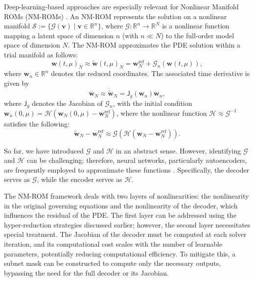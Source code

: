 \documentclass[11pt]{article}
\renewcommand{\vec}[1]{\mathbf{#1}}
\newcommand{\mat}[1]{\mathsf{#1}}
\begin{document}
            Deep-learning-based approaches are especially relevant for Nonlinear Manifold ROMs (NM-ROMs) \cite{kim2022fast,jain2017quadratic}.
            An NM-ROM represents the solution on a nonlinear manifold $\mathcal{S} := \{\mathscr{G} (\vec{v}) \mid \vec{v} \in \mathbb{R}^{n}\}$, where $\mathscr{G} : \mathbb{R}^{n} \rightarrow \mathbb{R}^{N}$ is a nonlinear function mapping a latent space of dimension $n$ (with $n \ll N$) to the full-order model space of dimension $N$.
            The NM-ROM approximates the PDE solution within a trial manifold as follows:
            \begin{equation}
                \vec{w}(t,\mu)_N \approx \widetilde{\vec{w}}(t,\mu)_N = \vec{w}^{\text{ref}}_N + \mathscr{G}_n(\vec{w}(t,\mu)),
                \label{eq:NM_ROM_gov}
            \end{equation}
            where $\vec{w}_n \in \mathbb{R}^{n}$ denotes the reduced coordinates.
            The associated time derivative is given by
            \begin{equation}
            \dot{\vec{w}}_N \approx \dot{\widetilde{\vec{w}}}_N = \mat{J}_g(\vec{w}_n) \dot{\vec{w}}_n,
            \end{equation}
            where $\mat{J}_g$ denotes the Jacobian of $\mathscr{G}_n$, with the initial condition $\vec{w}_{n}(0,\mu) = \mathscr{H} (\vec{w}_{N}(0,\mu) - \vec{w}_N^{\text{ref}})$, where the nonlinear function  $\mathscr{H} \approx \mathscr{G}^{-1}$ satisfies the following:
            \begin{equation}
                \widetilde{\vec{w}}_N - \vec{w}^{\text{ref}}_N \approx \mathscr{G}(\mathscr{H}(\vec{w}_N - \vec{w}^{\text{ref}}_N)).
            \end{equation}

            So far, we have introduced $\mathscr{G}$ and $\mathscr{H}$ in an abstract sense.
            However, identifying \(\mathscr{G}\) and \(\mathscr{H}\) can be challenging; therefore, neural networks, particularly autoencoders, are frequently employed to approximate these functions \cite{kim2022fast}.
            Specifically, the decoder serves as \(\mathscr{G}\), while the encoder serves as \(\mathscr{H}\).


            The NM-ROM framework deals with two layers of nonlinearities: the nonlinearity in the original governing equations and the nonlinearity of the decoder, which influences the residual of the PDE.
            The first layer can be addressed using the hyper-reduction strategies discussed earlier; however, the second layer necessitates special treatment.
            The Jacobian of the decoder must be computed at each solver iteration, and its computational cost scales with the number of learnable parameters, potentially reducing computational efficiency.
            To mitigate this, a subnet mask can be constructed to compute only the necessary outputs, bypassing the need for the full decoder or its Jacobian.
\end{document}
